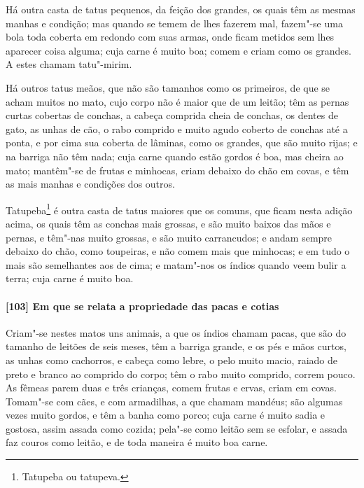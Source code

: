 Há outra casta de tatus pequenos, da feição dos grandes, os quais têm as mesmas manhas e
condição; mas quando se temem de lhes fazerem mal, fazem"-se uma bola toda coberta em
redondo com suas armas, onde ficam metidos sem lhes aparecer coisa alguma; cuja carne é
muito boa; comem e criam como os grandes. A estes chamam tatu"-mirim.

Há outros tatus meãos, que não são tamanhos como os primeiros, de que se acham muitos no
mato, cujo corpo não é maior que de um leitão; têm as pernas curtas cobertas de conchas, a
cabeça comprida cheia de conchas, os dentes de gato, as unhas de cão, o rabo comprido e
muito agudo coberto de conchas até a ponta, e por cima sua coberta de lâminas, como os
grandes, que são muito rijas; e na barriga não têm nada; cuja carne quando estão gordos é
boa, mas cheira ao mato; mantêm"-se de frutas e minhocas, criam debaixo do chão em covas, e
têm as mais manhas e condições dos outros.

Tatupeba\footnote{ Tatupeba ou tatupeva.} é outra casta de tatus maiores que os comuns,
que ficam nesta adição acima, os quais têm as conchas mais grossas, e são muito baixos das
mãos e pernas, e têm"-nas muito grossas, e são muito carrancudos; e andam sempre debaixo do
chão, como toupeiras, e não comem mais que minhocas; e em tudo o mais são semelhantes aos
de cima; e matam"-nos os índios quando veem bulir a terra; cuja carne é muito boa.

\paragraph{[103] Em que se relata a propriedade das pacas e cotias}\quad
Criam"-se nestes matos uns animais, a que os índios chamam pacas, que são do tamanho de
leitões de seis meses, têm a barriga grande, e os pés e mãos curtos, as unhas como
cachorros, e cabeça como lebre, o pelo muito macio, raiado de preto e branco ao comprido
do corpo; têm o rabo muito comprido, correm pouco. As fêmeas parem duas e três crianças,
comem frutas e ervas, criam em covas. Tomam"-se com cães, e com armadilhas, a que chamam
mandéus; são algumas vezes muito gordos, e têm a banha como porco; cuja carne é muito
sadia e gostosa, assim assada como cozida; pela"-se como leitão sem se esfolar, e assada
faz couros como leitão, e de toda maneira é muito boa carne.

